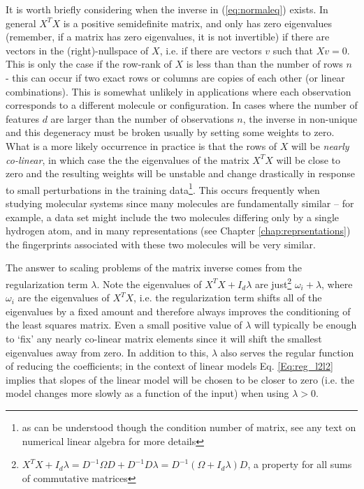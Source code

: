  It is worth briefly considering when the inverse in (\ref{eq:normaleq}) exists. In general $X^TX$ is a positive semidefinite matrix, and only has zero eigenvalues (remember, if a matrix has zero eigenvalues, it is not invertible) if there are vectors in the (right)-nullspace of $X$, i.e. if there are vectors $v$ such that $Xv=0$. This is only the case if the row-rank of $X$ is less than than the number of rows $n$ - this can occur if two exact rows or columns are copies of each other (or linear combinations). This is somewhat unlikely in applications where each observation corresponds to a different molecule or configuration. In cases where the number of features $d$ are larger than the number of observations $n$, the inverse in non-unique and this degeneracy must be broken usually by setting some weights to zero. What is a more likely occurrence in practice is that the rows of $X$ will be \textit{nearly co-linear}, in which case the the eigenvalues of the matrix $X^TX$ will be close to zero and the resulting weights will be unstable and change drastically in response to small perturbations in the training data\footnote{as can be understood though the condition number of matrix, see any text on numerical linear algebra for more details}.  This occurs frequently when studying molecular systems since many molecules are fundamentally similar -- for example, a data set might include the two molecules differing only by a single hydrogen atom, and in many representations (see Chapter \ref{chap:reprsentations}) the fingerprints associated with these two molecules will be very similar. 

The answer to scaling problems of the matrix inverse comes from the regularization term $\lambda$. Note the eigenvalues of  $X^TX + I_{d}\lambda$ are just\footnote{$X^TX +  I_{d}\lambda = D^{-1}\Omega D +   D^{-1}D\lambda = D^{-1}\left(\Omega + I_{d}\lambda\right)D$, a  property for all sums of commutative matrices} $\omega_i + \lambda$,  where $\omega_i$ are the eigenvalues of $X^TX$, i.e. the regularization term shifts all of the eigenvalues by a fixed amount and therefore always improves the conditioning of the least squares matrix. Even a small positive value of $\lambda$ will typically be enough to `fix' any nearly co-linear matrix elements since it will shift the smallest eigenvalues away from zero. In addition to this, $\lambda$ also serves the regular function of reducing the coefficients; in the context of linear models Eq. \ref{Eq:reg_l2l2} implies that slopes of the linear model will be chosen to be closer to zero (i.e. the model changes more slowly as a function of the input) when using $\lambda >0$.